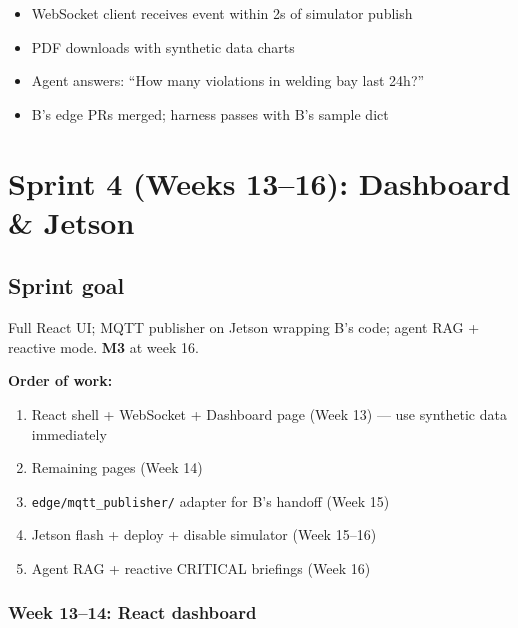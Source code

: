 \documentclass[12pt,a4paper]{report}
\begin{document}
\begin{verifybox}
\begin{itemize}
    \item[$\square$] WebSocket client receives event within 2s of simulator publish
    \item[$\square$] PDF downloads with synthetic data charts
    \item[$\square$] Agent answers: ``How many violations in welding bay last 24h?''
    \item[$\square$] B's edge PRs merged; harness passes with B's sample dict
\end{itemize}
\end{verifybox}

\chapter{Sprint 4 (Weeks 13--16): Dashboard \& Jetson}

\section{Sprint goal}

Full React UI; MQTT publisher on Jetson wrapping B's code; agent RAG + reactive mode. \textbf{M3} at week 16.

\begin{approachbox}
\textbf{Order of work:}
\begin{enumerate}
    \item React shell + WebSocket + Dashboard page (Week 13) --- use synthetic data immediately
    \item Remaining pages (Week 14)
    \item \texttt{edge/mqtt\_publisher/} adapter for B's handoff (Week 15)
    \item Jetson flash + deploy + disable simulator (Week 15--16)
    \item Agent RAG + reactive CRITICAL briefings (Week 16)
\end{enumerate}
\end{approachbox}

\subsection{Week 13--14: React dashboard}
\end{document}
